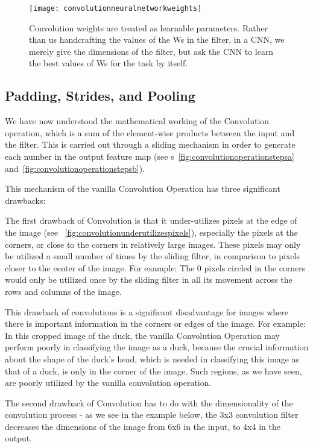 	\begin{figure}[h]
		\centering
		\texttt{[image: convolutionneuralnetworkweights]}
		\caption[Convolution weights are treated as learnable parameters.]{Convolution weights are treated as learnable parameters.  Rather than us handcrafting the values of the Ws in the filter, in a CNN, we merely give the dimensions of the filter, but ask the CNN to learn the best values of Ws for the task by itself.}
		\label{fig:convolutionneuralnetworkweights}
	\end{figure}


	\subsection{Padding, Strides, and Pooling}
	\begin{bulletedlist}
		\item We have now understood the mathematical working of the Convolution operation, which is a sum of the element-wise products between the input and the filter. This is carried out through a sliding mechanism in order to generate each number in the output feature map (see \figurename{}s~\ref{fig:convolutionoperationstepsa} and~\ref{fig:convolutionoperationstepsb}).
		\item This mechanism of the vanilla Convolution Operation has three significant drawbacks:
		\item The first drawback of Convolution is that it under-utilizes pixels at the edge of the image (see \figurename~\ref{fig:convolutionunderutilizespixels}), especially the pixels at the corners, or close to the corners in relatively large images.  These pixels may only be utilized a small number of times by the sliding filter, in comparison to pixels closer to the center of the image.  For example: The 0 pixels circled in the corners would only be utilized once by the sliding filter in all its movement across the rows and columns of the image.
		\item This drawback of convolutions is a significant disadvantage for images where there is important information in the corners or edges of the image.  For example: In this cropped image of the duck, the vanilla Convolution Operation may perform poorly in classifying the image as a duck, because the crucial information about the shape of the duck's head, which is needed in classifying this image as that of a duck, is only in the corner of the image. Such regions, as we have seen, are poorly utilized by the vanilla convolution operation.
		\item The second drawback of Convolution has to do with the dimensionality of the convolution process - as we see in the example below, the 3x3 convolution filter decreases the dimensions of the image from 6x6 in the input, to 4x4 in the output.

\end{bulletedlist}
